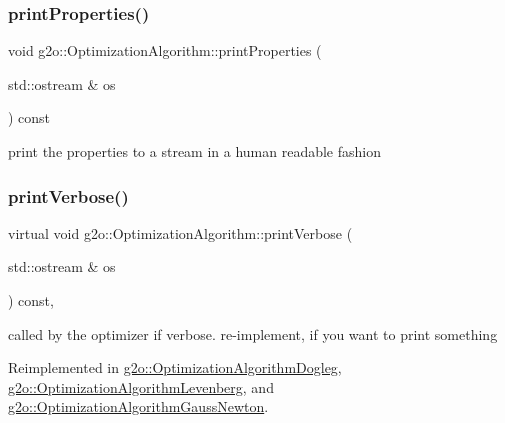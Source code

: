 \subsubsection{\texorpdfstring{print\+Properties()}{printProperties()}}
{\footnotesize\ttfamily void g2o\+::\+Optimization\+Algorithm\+::print\+Properties (\begin{DoxyParamCaption}\item[{std\+::ostream \&}]{os }\end{DoxyParamCaption}) const}

print the properties to a stream in a human readable fashion \mbox{\label{classg2o_1_1_optimization_algorithm_a6683d35e67402b50924bc4744b6e282a}} 
\subsubsection{\texorpdfstring{print\+Verbose()}{printVerbose()}}
{\footnotesize\ttfamily virtual void g2o\+::\+Optimization\+Algorithm\+::print\+Verbose (\begin{DoxyParamCaption}\item[{std\+::ostream \&}]{os }\end{DoxyParamCaption}) const\hspace{0.3cm}{\ttfamily [inline]}, {\ttfamily [virtual]}}

called by the optimizer if verbose. re-\/implement, if you want to print something 

Reimplemented in \mbox{\hyperlink{classg2o_1_1_optimization_algorithm_dogleg_a48f424443a7b2b6e8c532204cd7334cd}{g2o\+::\+Optimization\+Algorithm\+Dogleg}}, \mbox{\hyperlink{classg2o_1_1_optimization_algorithm_levenberg_a67308ead9762f478e29385229ea4b138}{g2o\+::\+Optimization\+Algorithm\+Levenberg}}, and \mbox{\hyperlink{classg2o_1_1_optimization_algorithm_gauss_newton_aff4c1b6a9f8a2e5c6777cfef9d4a18ba}{g2o\+::\+Optimization\+Algorithm\+Gauss\+Newton}}.

\mbox{\label{classg2o_1_1_optimization_algorithm_a0901951b7accc6744447c82dd043a07e}} 
